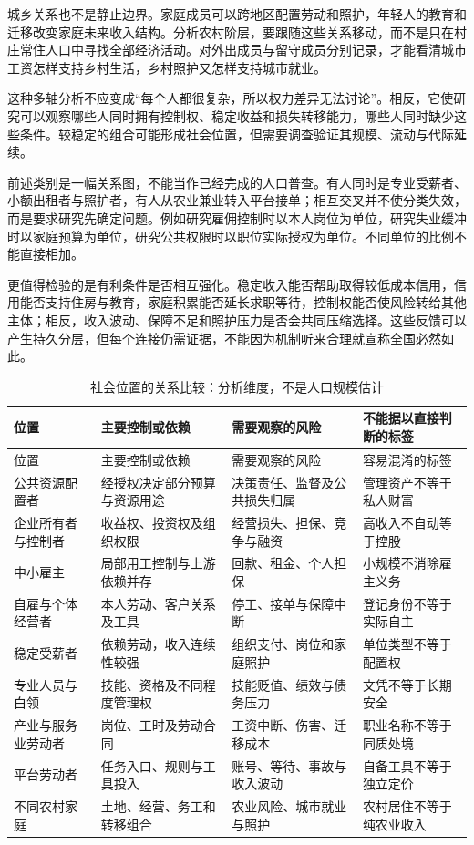 \documentclass[UTF8,fontset=fandol,zihao=-4,oneside,openany]{ctexbook}
\begin{document}
城乡关系也不是静止边界。家庭成员可以跨地区配置劳动和照护，年轻人的教育和迁移改变家庭未来收入结构。分析农村阶层，要跟随这些关系移动，而不是只在村庄常住人口中寻找全部经济活动。对外出成员与留守成员分别记录，才能看清城市工资怎样支持乡村生活，乡村照护又怎样支持城市就业。

这种多轴分析不应变成“每个人都很复杂，所以权力差异无法讨论”。相反，它使研究可以观察哪些人同时拥有控制权、稳定收益和损失转移能力，哪些人同时缺少这些条件。较稳定的组合可能形成社会位置，但需要调查验证其规模、流动与代际延续。

\label{arg:P174}
前述类别是一幅关系图，不能当作已经完成的人口普查。有人同时是专业受薪者、小额出租者与照护者，有人从农业兼业转入平台接单；相互交叉并不使分类失效，而是要求研究先确定问题。例如研究雇佣控制时以本人岗位为单位，研究失业缓冲时以家庭预算为单位，研究公共权限时以职位实际授权为单位。不同单位的比例不能直接相加。

更值得检验的是有利条件是否相互强化。稳定收入能否帮助取得较低成本信用，信用能否支持住房与教育，家庭积累能否延长求职等待，控制权能否使风险转给其他主体；相反，收入波动、保障不足和照护压力是否会共同压缩选择。这些反馈可以产生持久分层，但每个连接仍需证据，不能因为机制听来合理就宣称全国必然如此。

\begin{longtable}{p{}p{}p{}p{}}
\caption{社会位置的关系比较：分析维度，不是人口规模估计}\label{tab:positions}\\
\toprule 位置 & 主要控制或依赖 & 需要观察的风险 & 不能据以直接判断的标签\\\midrule\endfirsthead
\toprule 位置 & 主要控制或依赖 & 需要观察的风险 & 容易混淆的标签\\\midrule\endhead
公共资源配置者 & 经授权决定部分预算与资源用途 & 决策责任、监督及公共损失归属 & 管理资产不等于私人财富\\
企业所有者与控制者 & 收益权、投资权及组织权限 & 经营损失、担保、竞争与融资 & 高收入不自动等于控股\\
中小雇主 & 局部用工控制与上游依赖并存 & 回款、租金、个人担保 & 小规模不消除雇主义务\\
自雇与个体经营者 & 本人劳动、客户关系及工具 & 停工、接单与保障中断 & 登记身份不等于实际自主\\
稳定受薪者 & 依赖劳动，收入连续性较强 & 组织支付、岗位和家庭照护 & 单位类型不等于配置权\\
专业人员与白领 & 技能、资格及不同程度管理权 & 技能贬值、绩效与债务压力 & 文凭不等于长期安全\\
产业与服务业劳动者 & 岗位、工时及劳动合同 & 工资中断、伤害、迁移成本 & 职业名称不等于同质处境\\
平台劳动者 & 任务入口、规则与工具投入 & 账号、等待、事故与收入波动 & 自备工具不等于独立定价\\
不同农村家庭 & 土地、经营、务工和转移组合 & 农业风险、城市就业与照护 & 农村居住不等于纯农业收入\\
\bottomrule
\end{longtable}
\end{document}
